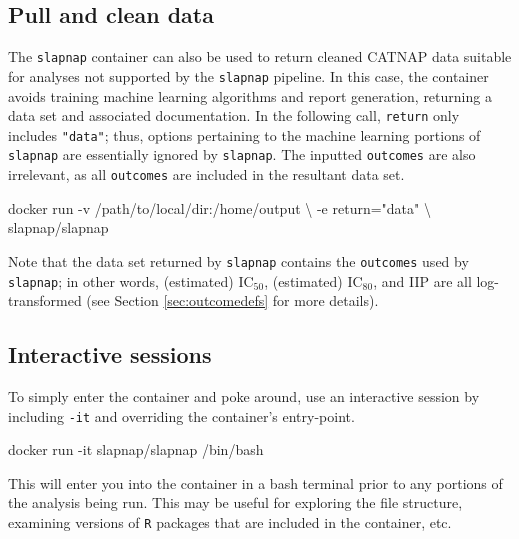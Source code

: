 \documentclass[]{article}
\newenvironment{Shaded}{\begin{snugshade}}{\end{snugshade}}
\newcommand{\StringTok}[1]{\textcolor[rgb]{0.31,0.60,0.02}{#1}}
\newcommand{\ExtensionTok}[1]{#1}
\newcommand{\NormalTok}[1]{#1}
\begin{document}
\subsection{Pull and clean data}\label{pull-and-clean-data}

The \texttt{slapnap} container can also be used to return cleaned CATNAP
data suitable for analyses not supported by the \texttt{slapnap}
pipeline. In this case, the container avoids training machine learning
algorithms and report generation, returning a data set and associated
documentation. In the following call, \texttt{return} only includes
\texttt{"data"}; thus, options pertaining to the machine learning
portions of \texttt{slapnap} are essentially ignored by
\texttt{slapnap}. The inputted \texttt{outcomes} are also irrelevant, as
all \texttt{outcomes} are included in the resultant data set.

\begin{Shaded}
\begin{Highlighting}[]
\ExtensionTok{docker}\NormalTok{ run -v /path/to/local/dir:/home/output \textbackslash{}}
\NormalTok{           -e return=}\StringTok{"data"}\NormalTok{ \textbackslash{}}
\NormalTok{           slapnap/slapnap}
\end{Highlighting}
\end{Shaded}

Note that the data set returned by \texttt{slapnap} contains the
\texttt{outcomes} used by \texttt{slapnap}; in other words, (estimated)
IC\(_{50}\), (estimated) IC\(_{80}\), and IIP are all log-transformed
(see Section \ref{sec:outcomedefs} for more details).

\subsection{Interactive sessions}\label{interactive-sessions}

To simply enter the container and poke around, use an interactive
session by including \texttt{-it} and overriding the container's
entry-point.

\begin{Shaded}
\begin{Highlighting}[]
\ExtensionTok{docker}\NormalTok{ run -it slapnap/slapnap /bin/bash}
\end{Highlighting}
\end{Shaded}

This will enter you into the container in a bash terminal prior to any
portions of the analysis being run. This may be useful for exploring the
file structure, examining versions of \texttt{R} packages that are
included in the container, etc.
\end{document}
